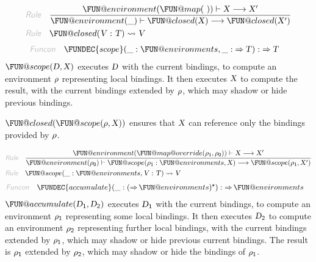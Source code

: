 \begin{align*}
  \KEY{Rule} \quad
    & \frac{
      \FUN@environment (  \FUN@map
                      (   \  ) ) \vdash \VAR{X} \TRANS 
        \VAR{X}'
      }{
      \FUN@environment (  \_ ) \vdash \FUN@closed
                    (  \VAR{X} ) \TRANS 
        \FUN@closed
          (  \VAR{X}' )
      }
\\
  \KEY{Rule} \quad
    & \FUN@closed
        (  \VAR{V} : \VAR{T} ) \leadsto 
        \VAR{V}
\end{align*}
\begin{align*}
  \KEY{Funcon} \quad
  & \FUNDEC{scope}(
                     \_ : \FUN@environments, \_ :  \TO \VAR{T}) 
    :  \TO \VAR{T} 
\end{align*}
$\FUN@scope
    (  \VAR{D}, 
           \VAR{X} )$ executes $\VAR{D}$ with the current bindings, to compute an environment
  $\VAR{\ensuremath{\rho}}$ representing local bindings. It then executes $\VAR{X}$ to compute the result,
  with the current bindings extended by $\VAR{\ensuremath{\rho}}$, which may shadow or hide previous
  bindings.

$\FUN@closed
    (  \FUN@scope
            (  \VAR{\ensuremath{\rho}}, 
                   \VAR{X} ) )$ ensures that $\VAR{X}$ can reference only the bindings
  provided by $\VAR{\ensuremath{\rho}}$.

\begin{align*}
  \KEY{Rule} \quad
    & \frac{
      \FUN@environment (  \FUN@map@override
                      (  \VAR{\ensuremath{\rho}}\SUB{1}, 
                             \VAR{\ensuremath{\rho}}\SUB{0} ) ) \vdash \VAR{X} \TRANS 
        \VAR{X}'
      }{
      \FUN@environment (  \VAR{\ensuremath{\rho}}\SUB{0} ) \vdash \FUN@scope
                    (  \VAR{\ensuremath{\rho}}\SUB{1} : \FUN@environments, 
                           \VAR{X} ) \TRANS 
        \FUN@scope
          (  \VAR{\ensuremath{\rho}}\SUB{1}, 
                 \VAR{X}' )
      }
\\
  \KEY{Rule} \quad
    & \FUN@scope
        (  \_ : \FUN@environments, 
               \VAR{V} : \VAR{T} ) \leadsto 
        \VAR{V}
\end{align*}
\begin{align*}
  \KEY{Funcon} \quad
  & \FUNDEC{accumulate}(
                     \_ : (   \TO \FUN@environments )\STAR) 
    :  \TO \FUN@environments 
\end{align*}
$\FUN@accumulate
    (  \VAR{D}\SUB{1}, 
           \VAR{D}\SUB{2} )$ executes $\VAR{D}\SUB{1}$ with the current bindings, to compute an
  environment $\VAR{\ensuremath{\rho}}\SUB{1}$ representing some local bindings. It then executes $\VAR{D}\SUB{2}$ to
  compute an environment $\VAR{\ensuremath{\rho}}\SUB{2}$ representing further local bindings, with the
  current bindings extended by $\VAR{\ensuremath{\rho}}\SUB{1}$, which may shadow or hide previous
  current bindings. The result is $\VAR{\ensuremath{\rho}}\SUB{1}$ extended by $\VAR{\ensuremath{\rho}}\SUB{2}$, which may shadow
  or hide the bindings of $\VAR{\ensuremath{\rho}}\SUB{1}$.

